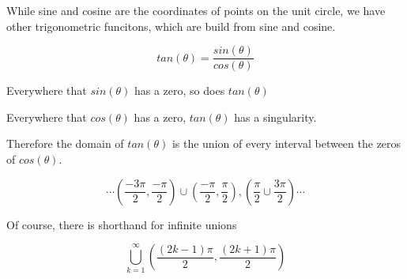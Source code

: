 \documentclass{ximera}
\begin{document}
While sine and cosine are the coordinates of points on the unit circle, we have other trigonometric funcitons, which are build from sine and cosine.




\[ tan(\theta) = \frac{sin(\theta)}{cos(\theta)} \]


Everywhere that $sin(\theta)$ has a zero, so does $tan(\theta)$

Everywhere that $cos(\theta)$ has a zero, $tan(\theta)$ has a singularity.


Therefore the domain of $tan(\theta)$ is the union of every interval between the zeros of $cos(\theta)$.


\[      \cdots     \left(\frac{-3\pi}{2}, \frac{-\pi}{2}\right) \cup \left(\frac{-\pi}{2}, \frac{\pi}{2}\right), \left(\frac{\pi}{2} \cup \frac{3\pi}{2}\right) \cdots              \]


Of course, there is shorthand for infinite unions







\[    \bigcup^\infty_{k=1} \left(\frac{(2k-1)\pi}{2}, \frac{(2k+1)\pi}{2}\right)   \]
\end{document}
